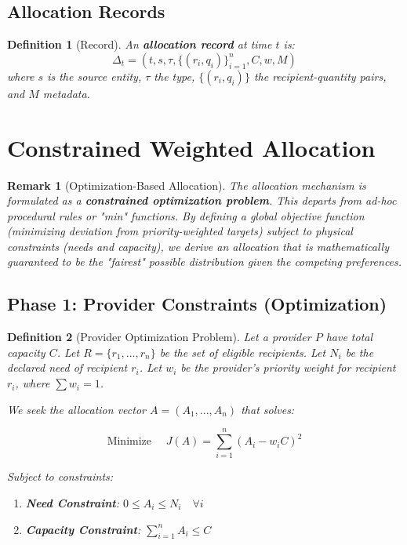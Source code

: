 \documentclass[11pt]{article}
\newtheorem{definition}{Definition}
\newtheorem{remark}{Remark}
\begin{document}
\subsection{Allocation Records}

\begin{definition}[Record]
An \textbf{allocation record} at time $t$ is:
\[
\Delta_t = (t, s, \tau, \{(r_i, q_i)\}_{i=1}^n, C, w, M)
\]
where $s$ is the source entity, $\tau$ the type, $\{(r_i, q_i)\}$ the recipient-quantity pairs, and $M$ metadata.
\end{definition}

\section{Constrained Weighted Allocation}

\begin{remark}[Optimization-Based Allocation]
The allocation mechanism is formulated as a \textbf{constrained optimization problem}. This departs from ad-hoc procedural rules or "min" functions. By defining a global objective function (minimizing deviation from priority-weighted targets) subject to physical constraints (needs and capacity), we derive an allocation that is mathematically guaranteed to be the "fairest" possible distribution given the competing preferences.
\end{remark}

\subsection{Phase 1: Provider Constraints (Optimization)}

\begin{definition}[Provider Optimization Problem]
Let a provider $P$ have total capacity $C$.
Let $R = \{r_1, ..., r_n\}$ be the set of eligible recipients.
Let $N_i$ be the declared need of recipient $r_i$.
Let $w_i$ be the provider's priority weight for recipient $r_i$, where $\sum w_i = 1$.

We seek the allocation vector $A = (A_1, ..., A_n)$ that solves:

\[
\text{Minimize } \quad J(A) = \sum_{i=1}^n \left( A_i - w_i C \right)^2
\]

Subject to constraints:
\begin{enumerate}
   \item \textbf{Need Constraint}: $0 \le A_i \le N_i \quad \forall i$
   \item \textbf{Capacity Constraint}: $\sum_{i=1}^n A_i \le C$
\end{enumerate}
\end{definition}
\end{document}

